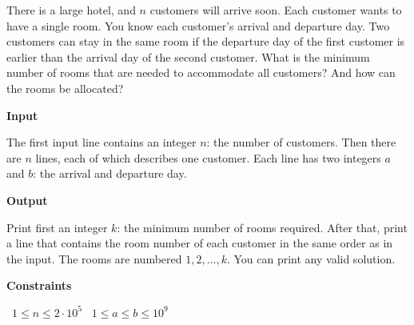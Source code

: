 There is a large hotel, and $n$ customers will arrive soon. Each customer wants to have a single room.
You know each customer's arrival and departure day. Two customers can stay in the same room if the departure day of the first customer is earlier than the arrival day of the second customer.
What is the minimum number of rooms that are needed to accommodate all customers? And how can the rooms be allocated?

\vspace{0.3cm}\noindent\textbf{Input}

The first input line contains an integer $n$: the number of customers.
Then there are $n$ lines, each of which describes one customer. Each line has two integers $a$ and $b$: the arrival and departure day.

\vspace{0.3cm}\noindent\textbf{Output}

Print first an integer $k$: the minimum number of rooms required.
After that, print a line that contains the room number of each customer in the same order as in the input. The rooms are numbered $1,2,\ldots,k$. You can print any valid solution.

\vspace{0.3cm}\noindent\textbf{Constraints}

\textbullet\ $1 \le n \le 2 \cdot 10^5$
\textbullet\ $1 \le a \le b \le 10^9$